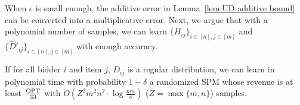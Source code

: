 	When $\epsilon$ is small enough, the additive error in Lemma~\ref{lem:UD additive bound} can be converted into a multiplicative error. Next, we argue that with a polynomial number of samples, we can learn $\{H_{ij}\}_{i\in[n],j\in[m]}$ and $\{\hat{D}'_{ij}\}_{i\in[n],j\in[m]}$ with enough accuracy.

\begin{theorem}\label{thm:UD regular}
If for all bidder $i$ and item $j$, $D_{ij}$ is a regular distribution, we can learn in polynomial time with probability $1-\delta$ a randomized SPM whose revenue is at least $\frac{\text{OPT}}{33}$ with $O\left(Z^2m^2 n^2\cdot \log \frac{nm}{\delta}\right)$ ($Z=\max\{m,n\}$) samples. %
\end{theorem}

